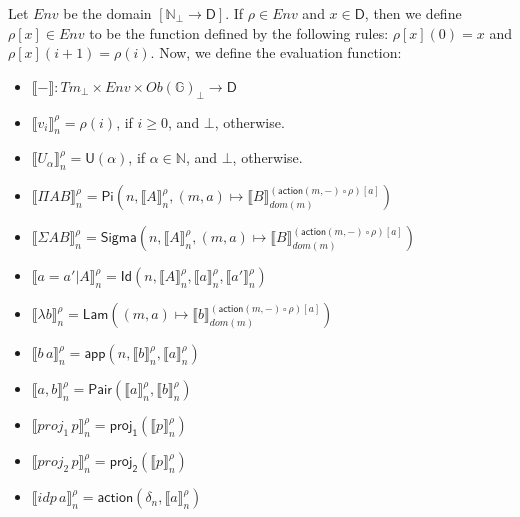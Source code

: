 \documentclass{amsart}
\theoremstyle{definition}
\theoremstyle{remark}
\newcommand{\D}{\mathsf{D}}
\newcommand{\bbG}{\mathbb{G}}
\newcommand{\nats}{\mathbb{N}}
\numberwithin{table}{section}
\begin{document}
Let $Env$ be the domain $[\nats_\bot \to \D]$.
If $\rho \in Env$ and $x \in \D$, then we define $\rho[x] \in Env$ to be the function defined by the following rules: $\rho[x](0) = x$ and $\rho[x](i+1) = \rho(i)$.
Now, we define the evaluation function:
\begin{itemize}
\item[] $\llbracket - \rrbracket : Tm_\bot \times Env \times Ob(\bbG)_\bot \to \D$
\item[] $\llbracket v_i \rrbracket^\rho_n = \rho(i)$, if $i \geq 0$, and $\bot$, otherwise.
\item[] $\llbracket U_\alpha \rrbracket^\rho_n = \mathsf{U}(\alpha)$, if $\alpha \in \nats$, and $\bot$, otherwise.
\item[] $\llbracket \Pi A B \rrbracket^\rho_n = \mathsf{Pi}(n, \llbracket A \rrbracket^\rho_n, (m, a) \mapsto \llbracket B \rrbracket^{(\mathsf{action}(m,-) \circ \rho)[a]}_{dom(m)})$
\item[] $\llbracket \Sigma A B \rrbracket^\rho_n = \mathsf{Sigma}(n, \llbracket A \rrbracket^\rho_n, (m, a) \mapsto \llbracket B \rrbracket^{(\mathsf{action}(m,-) \circ \rho)[a]}_{dom(m)})$
\item[] $\llbracket a = a' | A \rrbracket^\rho_n = \mathsf{Id}(n, \llbracket A \rrbracket^\rho_n, \llbracket a \rrbracket^\rho_n, \llbracket a' \rrbracket^\rho_n)$
\item[] $\llbracket \lambda b \rrbracket^\rho_n = \mathsf{Lam}((m, a) \mapsto \llbracket b \rrbracket^{(\mathsf{action}(m,-) \circ \rho)[a]}_{dom(m)})$
\item[] $\llbracket b\,a \rrbracket^\rho_n = \mathsf{app}(n, \llbracket b \rrbracket^\rho_n, \llbracket a \rrbracket^\rho_n)$
\item[] $\llbracket a, b \rrbracket^\rho_n = \mathsf{Pair}(\llbracket a \rrbracket^\rho_n, \llbracket b \rrbracket^\rho_n)$
\item[] $\llbracket proj_1\,p \rrbracket^\rho_n = \mathsf{proj_1}(\llbracket p \rrbracket^\rho_n)$
\item[] $\llbracket proj_2\,p \rrbracket^\rho_n = \mathsf{proj_2}(\llbracket p \rrbracket^\rho_n)$
\item[] $\llbracket idp\,a \rrbracket^\rho_n = \mathsf{action}(\delta_n, \llbracket a \rrbracket^\rho_n)$
\end{itemize}
\end{document}
